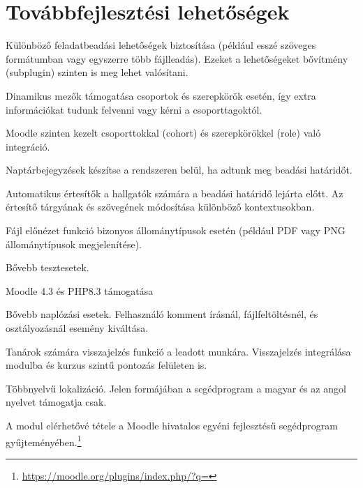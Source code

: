 \section{Továbbfejlesztési lehetőségek}

\begin{compactitem}
 \item Különböző feladatbeadási lehetőségek biztosítása (például esszé szöveges formátumban vagy egyszerre több fájlleadás). Ezeket a lehetőségeket bővítmény (subplugin) szinten is meg lehet valósítani.
\item Dinamikus mezők támogatása csoportok és szerepkörök esetén, így extra információkat tudunk felvenni vagy kérni a csoporttagoktól.
\item  Moodle szinten kezelt csoporttokkal (cohort) és szerepkörökkel (role) való integráció.
\item Naptárbejegyzések készítse a rendszeren belül, ha adtunk meg beadási határidőt.
	\item Automatikus értesítők a hallgatók számára a beadási határidő lejárta előtt. Az értesítő tárgyának és szövegének módosítása különböző kontextusokban. 
\item Fájl előnézet funkció bizonyos állománytípusok esetén (például PDF vagy PNG állománytípusok megjelenítése).
\item Bővebb tesztesetek.
\item Moodle 4.3 és PHP8.3 támogatása
\item Bővebb naplózási esetek. Felhasználó komment írásnál, fájlfeltöltésnél, és osztályozásnál esemény kiváltása.
\item Tanárok számára visszajelzés funkció a leadott munkára. Visszajelzés integrálása modulba és kurzus szintű pontozás felületen is.
\item Többnyelvű lokalizáció. Jelen formájában a segédprogram a magyar és az angol nyelvet támogatja csak.
\item A modul elérhetővé tétele a Moodle hivatalos egyéni fejlesztésű segédprogram gyűjteményében.\footnote{\url{https://moodle.org/plugins/index.php/?q=}}
 \end{compactitem}